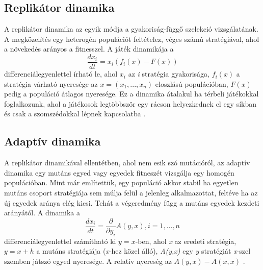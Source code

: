 \subsection{Replikátor dinamika}
A replikátor dinamika az egyik módja a gyakoriság-függő szelekció vizsgálatának. A megközelítés egy heterogén populációt feltételez, véges számú stratégiával, ahol a növekedés arányos a fitnesszel. A játék dinamikája a 
\begin{equation}
\frac{dx_i}{dt} = x_i(f_i(x) - F(x))
\end{equation}
differenciálegyenlettel írható le, ahol \(x_i\) az \textit{i} stratégia gyakorisága, \(f_i(x)\) a stratégia várható nyeresége az \(x = (x_1,...,x_n)\) eloszlású populációban, \(F(x)\) pedig a populáció átlagos nyeresége.
Ez a dinamika átalakul ha térbeli játékokkal foglalkozunk, ahol a játékosok legtöbbször egy rácson helyezkednek el egy síkban és csak a szomszédokkal lépnek kapcsolatba \cite{hummert2014evolutionary}. 

\subsection{Adaptív dinamika}
A replikátor dinamikával ellentétben, ahol nem esik szó mutációról, az adaptív dinamika egy mutáns egyed vagy egyedek fitneszét vizsgálja egy homogén populációban. Mint már említettük, egy populáció akkor stabil ha egyetlen mutáns csoport stratégiája sem múlja felül a jelenleg alkalmazottat, feltéve ha az új egyedek aránya elég kicsi. Tehát a végeredmény függ a mutáns egyedek  kezdeti arányától. A dinamika a 
\begin{equation}
\frac{dx_i}{dt} = \frac{\partial}{\partial y_i}A(y,x), i = 1,...,n
\end{equation}
differenciálegyenlettel számítható ki \(y = x\)-ben, ahol \textit{x} az eredeti stratégia, \(y = x + h\) a mutáns stratégiája (\textit{x}-hez közel álló), \textit{A(y,x)} egy \textit{y} stratégiát \textit{x}-szel szemben játszó egyed nyeresége. A relatív nyereség az \(A(y,x) - A(x,x)\) \cite{hummert2014evolutionary}.

